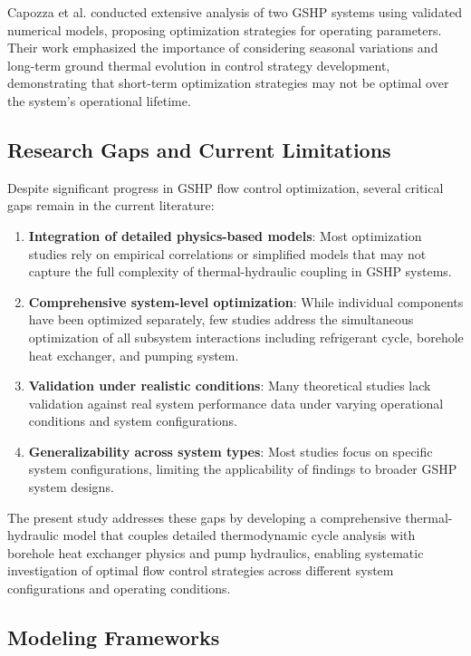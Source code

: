 \documentclass[journal=iecr,manuscript=]{achemso}
\begin{document}
Capozza et al. \citep{capozza2015long} conducted extensive analysis of
two GSHP systems using validated numerical models, proposing
optimization strategies for operating parameters. Their work emphasized
the importance of considering seasonal variations and long-term ground
thermal evolution in control strategy development, demonstrating that
short-term optimization strategies may not be optimal over the system's
operational lifetime.

\subsection{Research Gaps and Current
Limitations}\label{research-gaps-and-current-limitations}

Despite significant progress in GSHP flow control optimization, several
critical gaps remain in the current literature:

\begin{enumerate}
\def\labelenumi{\arabic{enumi}.}
\item
  \textbf{Integration of detailed physics-based models}: Most
  optimization studies rely on empirical correlations or simplified
  models that may not capture the full complexity of thermal-hydraulic
  coupling in GSHP systems.
\item
  \textbf{Comprehensive system-level optimization}: While individual
  components have been optimized separately, few studies address the
  simultaneous optimization of all subsystem interactions including
  refrigerant cycle, borehole heat exchanger, and pumping system.
\item
  \textbf{Validation under realistic conditions}: Many theoretical
  studies lack validation against real system performance data under
  varying operational conditions and system configurations.
\item
  \textbf{Generalizability across system types}: Most studies focus on
  specific system configurations, limiting the applicability of findings
  to broader GSHP system designs.
\end{enumerate}

The present study addresses these gaps by developing a comprehensive
thermal-hydraulic model that couples detailed thermodynamic cycle
analysis with borehole heat exchanger physics and pump hydraulics,
enabling systematic investigation of optimal flow control strategies
across different system configurations and operating conditions.

\subsection{Modeling Frameworks}\label{modeling-frameworks}
\end{document}
